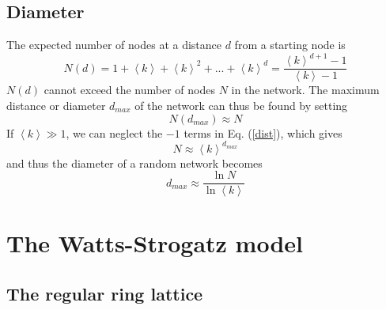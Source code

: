\documentclass[11 pt , letterpaper , twoside , openright]{book}
\begin{document}
\subsection{Diameter}\label{ERdist}
The expected number of nodes at a distance $d$ from a starting node is \cite{Albert2014}
\begin{equation}\label{dist}
	N(d) = 1 + \left<k\right> + \left<k\right>^2 + ... + \left<k\right>^d = \frac{\left<k\right>^{d+1} - 1}{\left<k\right> - 1}
\end{equation}
$N(d)$ cannot exceed the number of nodes $N$ in the network. The maximum distance or diameter $d_{max}$ of the network can thus be found by setting \cite{Albert2014}
\begin{equation}
	N(d_{max}) \approx N
\end{equation}
If $\left<k\right> \gg 1$, we can neglect the $-1$ terms in Eq. (\ref{dist}), which gives \cite{Albert2014}
\begin{equation}
	N \approx \left<k\right>^{d_{max}}
\end{equation}
and thus the diameter of a random network becomes \cite{Albert2014}
\begin{equation}
	d_{max} \approx \frac{\ln{N}}{\ln{\left<k\right>}}
\end{equation} 

\section{The Watts-Strogatz model}\label{WS}
\subsection{The regular ring lattice}\label{ringclus}
\end{document}
